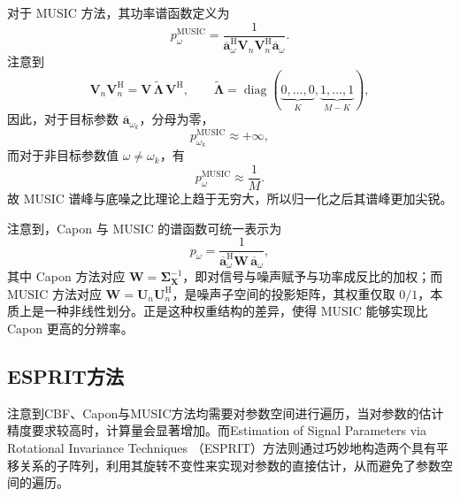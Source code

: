 对于 MUSIC 方法，其功率谱函数定义为
\[
    p_{\omega}^{\text{MUSIC}}
    = \frac{1}{\overline{\bm{a}}_{\omega}^{\mathrm{H}}
    \mathbf{V}_n \mathbf{V}_n^{\mathrm{H}}
    \overline{\bm{a}}_{\omega}}.
\]
注意到
\[
    \mathbf{V}_n \mathbf{V}_n^{\mathrm{H}}
    = \mathbf{V}\,\tilde{\mathbf{\Lambda}}\,\mathbf{V}^{\mathrm{H}}, \qquad
    \tilde{\mathbf{\Lambda}}
    = \operatorname{diag}(\underbrace{0,\dots,0}_{K},
    \underbrace{1,\dots,1}_{M-K}),
\]
因此，对于目标参数 \(\overline{\bm{a}}_{\omega_k}\)，分母为零，
\[
    p_{\omega_k}^{\text{MUSIC}} \approx +\infty,
\]
而对于非目标参数值 \(\omega \neq \omega_k\)，有
\[
    p_{\omega}^{\text{MUSIC}} \approx \frac{1}{M}.
\]
故 MUSIC 谱峰与底噪之比理论上趋于无穷大，所以归一化之后其谱峰更加尖锐。

注意到，Capon 与 MUSIC 的谱函数可统一表示为
\[
    p_{\omega} = \frac{1}{\overline{\bm{a}}_{\omega}^{\mathrm{H}}
        \mathbf{W}\,\overline{\bm{a}}_{\omega}},
\]
其中 Capon 方法对应 \(\mathbf{W} = \mathbf{\Sigma}_{\mathbf{X}}^{-1}\)，即对信号与噪声赋予与功率成反比的加权；而 MUSIC 方法对应 \(\mathbf{W} = \mathbf{U}_n \mathbf{U}_n^{\mathrm{H}}\)，是噪声子空间的投影矩阵，其权重仅取 \(0/1\)，本质上是一种非线性划分。正是这种权重结构的差异，使得 MUSIC 能够实现比 Capon 更高的分辨率。

\subsection{ESPRIT方法}
注意到CBF、Capon与MUSIC方法均需要对参数空间进行遍历，当对参数的估计精度要求较高时，计算量会显著增加。而Estimation of Signal Parameters via Rotational Invariance Techniques （ESPRIT）方法则通过巧妙地构造两个具有平移关系的子阵列，利用其旋转不变性来实现对参数的直接估计，从而避免了参数空间的遍历。

